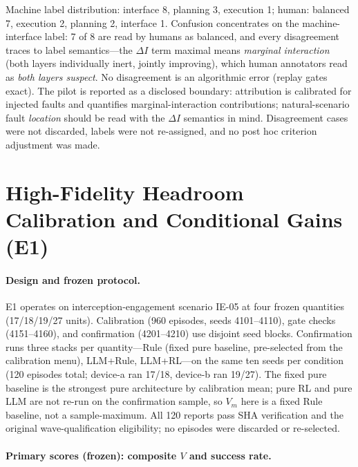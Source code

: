 \documentclass[sigconf,anonymous]{aamas}
\begin{document}
Machine label distribution: interface 8, planning 3, execution 1; human: balanced 7, execution 2, planning 2, interface 1. Confusion concentrates on the machine-interface label: 7 of 8 are read by humans as balanced, and every disagreement traces to label semantics---the $\Delta I$ term maximal means \emph{marginal interaction} (both layers individually inert, jointly improving), which human annotators read as \emph{both layers suspect}. No disagreement is an algorithmic error (replay gates exact). The pilot is reported as a disclosed boundary: attribution is calibrated for injected faults and quantifies marginal-interaction contributions; natural-scenario fault \emph{location} should be read with the $\Delta I$ semantics in mind. Disagreement cases were not discarded, labels were not re-assigned, and no post hoc criterion adjustment was made.

\section{High-Fidelity Headroom Calibration and Conditional Gains (E1)}\label{app:K}

\paragraph{Design and frozen protocol.}
E1 operates on interception-engagement scenario IE-05 at four frozen quantities (17/18/19/27 units). Calibration (960 episodes, seeds 4101--4110), gate checks (4151--4160), and confirmation (4201--4210) use disjoint seed blocks. Confirmation runs three stacks per quantity---Rule (fixed pure baseline, pre-selected from the calibration menu), LLM+Rule, LLM+RL---on the same ten seeds per condition (120 episodes total; device-a ran 17/18, device-b ran 19/27). The fixed pure baseline is the strongest pure architecture by calibration mean; pure RL and pure LLM are not re-run on the confirmation sample, so $V_m$ here is a fixed Rule baseline, not a sample-maximum. All 120 reports pass SHA verification and the original wave-qualification eligibility; no episodes were discarded or re-selected.

\paragraph{Primary scores (frozen): composite $V$ and success rate.}
\begin{center}
\end{center}
\end{document}
